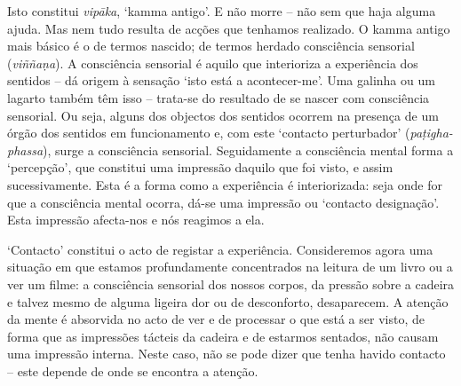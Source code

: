 Isto constitui \emph{vipāka}, `kamma antigo'. E não morre -- não sem que haja
alguma ajuda. Mas nem tudo resulta de acções que tenhamos realizado. O kamma
antigo mais básico é o de termos nascido; de termos herdado consciência
sensorial (\emph{viññaṇa}). A consciência sensorial é aquilo que interioriza a
experiência dos sentidos -- dá origem à sensação `isto está a acontecer-me'. Uma
galinha ou um lagarto também têm isso -- trata-se do resultado de se nascer com
consciência sensorial. Ou seja, alguns dos objectos dos sentidos ocorrem na
presença de um órgão dos sentidos em funcionamento e, com este `contacto
perturbador' (\emph{paṭigha-phassa}), surge a consciência sensorial.
Seguidamente a consciência mental forma a `percepção', que constitui uma
impressão daquilo que foi visto, e assim sucessivamente. Esta é a forma como a
experiência é interiorizada: seja onde for que a consciência mental ocorra,
dá-se uma impressão ou `contacto designação'. Esta impressão afecta-nos e nós reagimos a ela.

`Contacto' constitui o acto de registar a experiência. Consideremos agora uma
situação em que estamos profundamente concentrados na leitura de um livro ou a
ver um filme: a consciência sensorial dos nossos corpos, da pressão sobre a
cadeira e talvez mesmo de alguma ligeira dor ou de desconforto, desaparecem. A
atenção da mente é absorvida no acto de ver e de processar o que está a ser
visto, de forma que as impressões tácteis da cadeira e de estarmos sentados, não
causam uma impressão interna.
Neste caso, não se pode dizer que tenha havido contacto -- este depende de onde
se encontra a atenção.

